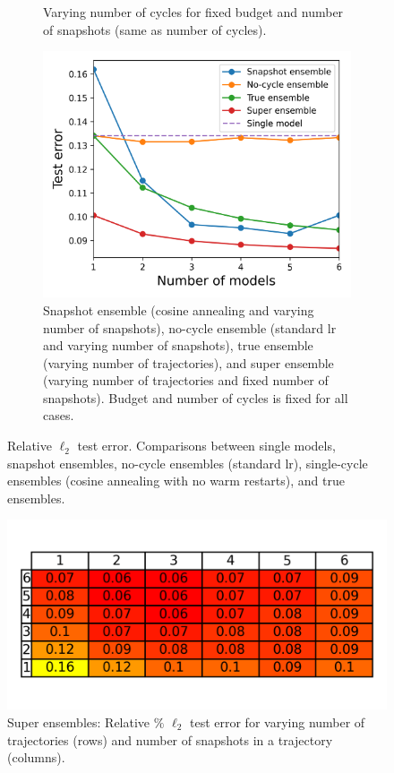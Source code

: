 \begin{figure}[H]
\begin{subfigure}{.45\textwidth}
		\caption{Varying number of cycles for fixed budget and number of snapshots (same as number of cycles).\newline\newline}
		\label{fig:sub-second}
	\end{subfigure}
	\begin{subfigure}{1\textwidth}
		\centering
		\includegraphics[width=.7\linewidth]{./figs/vary_snaps.png}  
		\caption{Snapshot ensemble (cosine annealing and varying number of snapshots), no-cycle ensemble (standard lr and varying number of snapshots), true ensemble (varying number of trajectories), and super ensemble (varying number of trajectories and fixed number of snapshots). Budget and number of cycles is fixed for all cases.}
		\label{fig:sub-second}
	\end{subfigure}
	\caption{Relative $\ell_2$ test error. Comparisons between single models, snapshot ensembles, no-cycle ensembles (standard lr), single-cycle ensembles (cosine annealing with no warm restarts), and true ensembles.}
	\label{fig:fig}
\end{figure}

\begin{figure}[H]
	\centering
	\includegraphics[width=0.6\linewidth]{./figs/kmn_plot.png}  
	\caption{Super ensembles: Relative $\%$ $\ell_2$ test error for varying number of trajectories (rows) and number of snapshots in a trajectory (columns).}
	\label{fig:sub-first}
\end{figure}

